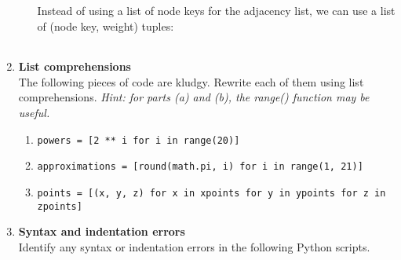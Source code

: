 \documentclass{article}
\newcounter{points}
\begin{document}
\begin{enumerate}
\begin{enumerate}
Instead of using a list of node keys for the adjacency list, we can use a list of (node key, weight) tuples: \\
\begin{tabular}{c}

\end{tabular}

\end{enumerate}




\item \textbf{List comprehensions} \\
The following pieces of code are kludgy.  Rewrite each of them using list comprehensions.  \emph{Hint: for parts (a) and (b), the range() function may be useful.}

\begin{enumerate}
\item 
\texttt{powers = [2 ** i for i in range(20)]}
\end{enumerate}

\begin{enumerate}
\setcounter{enumii}{1}
\item 
\texttt{approximations = [round(math.pi, i) for i in range(1, 21)]}
\end{enumerate}

\begin{enumerate}
\setcounter{enumii}{2}
\item 
\texttt{points = [(x, y, z) for x in xpoints for y in ypoints for z in zpoints]}
\end{enumerate}

\newpage
\item \textbf{Syntax and indentation errors} \\
Identify any syntax or indentation errors in the following Python scripts.


\end{enumerate}
\end{document}
